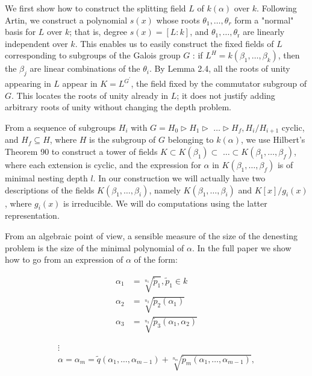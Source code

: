 \documentclass[11pt,letterpaper]{article}
\begin{document}
We first show how to construct the splitting field $L$ of $k(\alpha)$ over $k$. Following Artin, we construct a polynomial $s(x)$ whose roots $\theta_{1}, \ldots, \theta_{r}$ form a "normal" basis for $L$ over $k$; that is, degree $s(x)=[L: k]$, and $\theta_{1}, \ldots, \theta_{\mathrm{r}}$ are linearly independent over $k$. This enables us to easily construct the fixed fields of $L$ corresponding to subgroups of the Galois group $G$ : if $L^{H}=k\left(\beta_{1}, \ldots, \beta_{k}\right)$, then the $\beta_{j}$ are linear combinations of the $\theta_{i}$. By Lemma 2.4, all the roots of unity appearing in $L$ appear in $K=L^{G^{\prime}}$, the field fixed by the commutator subgroup of $G$. This locates the roots of unity already in $L$; it does not justify adding arbitrary roots of unity without changing the depth problem.

From a sequence of subgroups $H_{i}$ with $G=H_{0} \triangleright H_{1} \triangleright$ $\ldots \triangleright H_{f}, H_{i} / H_{i+1}$ cyclic, and $H_{f} \subseteq H$, where $H$ is the subgroup of $G$ belonging to $k(\alpha)$, we use Hilbert's Theorem 90 to construct a tower of fields $K \subset K\left(\beta_{1}\right) \subset$ $\ldots \subset K\left(\beta_{1}, \ldots, \beta_{f}\right)$, where each extension is cyclic, and the expression for $\alpha$ in $K\left(\beta_{1}, \ldots, \beta_{f}\right)$ is of minimal nesting depth $l$. In our construction we will actually have two descriptions of the fields $K\left(\beta_{1}, \ldots, \beta_{i}\right)$, namely $K\left(\beta_{1}, \ldots, \beta_{i}\right)$ and $K[x] / g_{i}(x)$, where $g_{i}(x)$ is irreducible. We will do computations using the latter representation.

From an algebraic point of view, a sensible measure of the size of the denesting problem is the size of the minimal polynomial of $\alpha$. In the full paper we show how to go from an expression of $\alpha$ of the form:

\[
\begin{aligned}
\alpha_{1} & =\sqrt[n_1]{\tilde{p}_{1}}, \tilde{p}_{1} \in k \\
\alpha_{2} & =\sqrt[n_2]{\tilde{p}_{2}\left(\alpha_{1}\right)} \\
\alpha_{3} & =\sqrt[n_{3}]{\tilde{p}_{3}\left(\alpha_{1}, \alpha_{2}\right)}
\end{aligned}
\]

\[
\begin{gathered}
\vdots \\
\alpha=\alpha_{m}=\tilde{q}\left(\alpha_{1}, \ldots, \alpha_{m-1}\right)+\sqrt[n_m]{\tilde{p}_{m}\left(\alpha_{1}, \ldots, \alpha_{m-1}\right)},
\end{gathered}
\]
\end{document}
